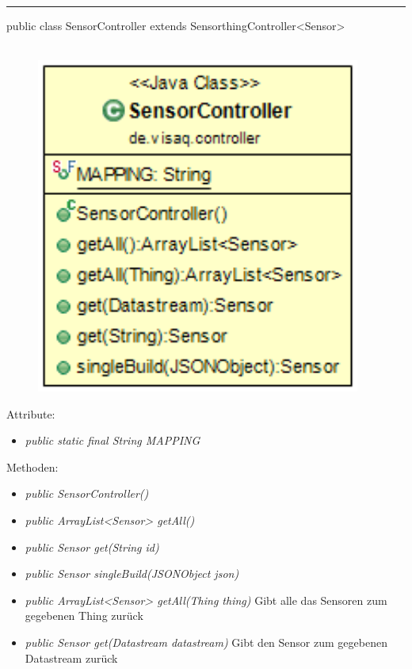 \rule{\textwidth}{0.4pt}
public class SensorController extends SensorthingController<Sensor>
\\\\
\begin{minipage}{0.3\textwidth}
    \begin{figure}[H]
        {\centering\includegraphics[width=0.95\textwidth]{media/backend/controller/classes/SensorController.png}}
    \end{figure}
    \end{minipage} \hfill
\begin{minipage}{0.7\textwidth}
\end{minipage}

Attribute:
\begin{itemize}
    \item \emph{public static final String MAPPING} \mappingDescription
\end{itemize}
Methoden:
\begin{itemize}
    \item \emph{public SensorController()}
    \item \emph{public ArrayList<Sensor> getAll()}
    \extendsSensorthingController
    \item \emph{public Sensor get(String id)}
    \extendsSensorthingController
    \item \emph{public Sensor singleBuild(JSONObject json)}
    \extendsSensorthingController
    \item \emph{public ArrayList<Sensor> getAll(Thing thing)}
    Gibt alle das Sensoren zum gegebenen Thing zurück
    \item \emph{public Sensor get(Datastream datastream)}
    Gibt den Sensor zum gegebenen Datastream zurück
\end{itemize}

